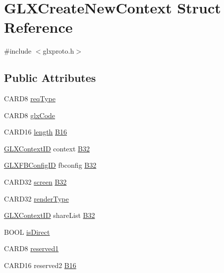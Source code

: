 \hypertarget{struct_g_l_x_create_new_context}{}\section{G\+L\+X\+Create\+New\+Context Struct Reference}
\label{struct_g_l_x_create_new_context}


{\ttfamily \#include $<$glxproto.\+h$>$}

\subsection*{Public Attributes}
\begin{DoxyCompactItemize}
\item 
C\+A\+R\+D8 \hyperlink{struct_g_l_x_create_new_context_a73b016b590f01996b5d67896bd549a05}{req\+Type}
\item 
C\+A\+R\+D8 \hyperlink{struct_g_l_x_create_new_context_ab8ef95d55fd81d6bdd6d349389d7c258}{glx\+Code}
\item 
C\+A\+R\+D16 \hyperlink{glcorearb_8h_ab9c919755bde3b34349e23a32b4e0fa7}{length} \hyperlink{struct_g_l_x_create_new_context_a4f9abfbbd5fbc6b06c3727b118475a14}{B16}
\item 
\hyperlink{glx_8h_a17c7ca5b76cc448032df0b5352803005}{G\+L\+X\+Context\+ID} context \hyperlink{struct_g_l_x_create_new_context_ab283fd5957b19b0e71972b16ca6a38e5}{B32}
\item 
\hyperlink{glx_8h_a38e78acefebf732d1a0da441ad1de05f}{G\+L\+X\+F\+B\+Config\+ID} fbconfig \hyperlink{struct_g_l_x_create_new_context_a9c7e4b23b7890a7988ca95d21bc0373c}{B32}
\item 
C\+A\+R\+D32 \hyperlink{cad_8h_ae04e09e4e3831bfc1632c509ae37dcec}{screen} \hyperlink{struct_g_l_x_create_new_context_aa28cc41767f5d0054966f77f880e4227}{B32}
\item 
C\+A\+R\+D32 \hyperlink{struct_g_l_x_create_new_context_ab45cdae5376356d46f3341251ef899d1}{render\+Type}
\item 
\hyperlink{glx_8h_a17c7ca5b76cc448032df0b5352803005}{G\+L\+X\+Context\+ID} share\+List \hyperlink{struct_g_l_x_create_new_context_a260160f562744c3e67eefe2edb533dd2}{B32}
\item 
B\+O\+OL \hyperlink{struct_g_l_x_create_new_context_a5ca82dc39309d95edee8ae9106a9aa2b}{is\+Direct}
\item 
C\+A\+R\+D8 \hyperlink{struct_g_l_x_create_new_context_a21643f13d49e80ba797cc4583ab75662}{reserved1}
\item 
C\+A\+R\+D16 reserved2 \hyperlink{struct_g_l_x_create_new_context_ac858193c5cb93c54e2bb4e895731d7c9}{B16}
\end{DoxyCompactItemize}


